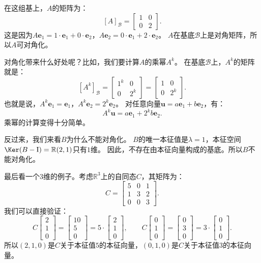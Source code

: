 \documentclass[12pt,UTF8,fontset=none]{ctexbook}
\begin{document}
在这组基上，$A$的矩阵为：
$$
[A]_{\mathcal{B}} = \begin{bmatrix} 1 & 0 \\ 0 & 2 \end{bmatrix}.
$$
这是因为$A\mathbf{e}_1 = 1\cdot\mathbf{e}_1 + 0\cdot\mathbf{e}_2$，$A\mathbf{e}_2 = 0\cdot\mathbf{e}_1 + 2\cdot\mathbf{e}_2$。
$A$在基底$\mathcal{B}$上是对角矩阵，所以$A$可对角化。

对角化带来什么好处呢？比如，我们要计算$A$的乘幂$A^k$。
在基底$\mathcal{B}$上，$A^k$的矩阵就是：
$$
[A^k]_{\mathcal{B}} = \begin{bmatrix} 1^k & 0 \\ 0 & 2^k \end{bmatrix} = \begin{bmatrix} 1 & 0 \\ 0 & 2^k \end{bmatrix}.
$$
也就是说，$A^k\mathbf{e}_1 = \mathbf{e}_1$，$A^k\mathbf{e}_2 = 2^k\mathbf{e}_2$。
对任意向量$\mathbf{u} = a\mathbf{e}_1 + b\mathbf{e}_2$，有：
$$
A^k\mathbf{u} = a\mathbf{e}_1 + 2^k b\mathbf{e}_2.
$$
乘幂的计算变得十分简单。

反过来，我们来看$B$为什么不能对角化。
$B$的唯一本征值是$\lambda = 1$，本征空间$\Ker(B - \mathrm{I}) = \mathbb{R} (2,1)$只有$1$维。
因此，不存在由本征向量构成的基底。所以$B$不能对角化。

最后看一个$3$维的例子。考虑$\mathbb{R}^3$上的自同态$C$，其矩阵为：
$$
C = \begin{bmatrix} 5 & 0 & 1 \\ 1 & 3 & 2 \\ 0 & 0 & 3 \end{bmatrix}.
$$
我们可以直接验证：
$$
C \begin{bmatrix} 2 \\ 1 \\ 0 \end{bmatrix} = \begin{bmatrix} 10 \\ 5 \\ 0 \end{bmatrix} = 5 \cdot \begin{bmatrix} 2 \\ 1 \\ 0 \end{bmatrix},
\qquad
C \begin{bmatrix} 0 \\ 1 \\ 0 \end{bmatrix} = \begin{bmatrix} 0 \\ 3 \\ 0 \end{bmatrix} = 3 \cdot \begin{bmatrix} 0 \\ 1 \\ 0 \end{bmatrix}.
$$
所以$(2,1,0)$是$C$关于本征值$5$的本征向量，$(0,1,0)$是$C$关于本征值$3$的本征向量。
\end{document}
